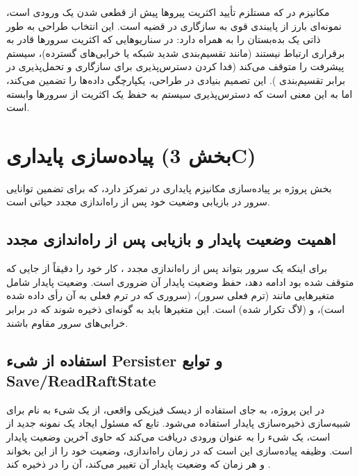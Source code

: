 \documentclass[12pt,a4paper]{article}
\begin{document}
مکانیزم  در  که مستلزم تأیید اکثریت پیروها پیش از قطعی شدن یک ورودی است، نمونه‌ای بارز از پایبندی قوی به سازگاری  در قضیه  است. این انتخاب طراحی به طور ذاتی یک بده‌بستان را به همراه دارد: در سناریوهایی که اکثریت سرورها قادر به برقراری ارتباط نیستند (مانند تقسیم‌بندی شدید شبکه یا خرابی‌های گسترده)، سیستم پیشرفت را متوقف می‌کند (فدا کردن دسترس‌پذیری  برای سازگاری و تحمل‌پذیری در برابر تقسیم‌بندی ). این تصمیم بنیادی در طراحی، یکپارچگی داده‌ها را تضمین می‌کند، اما به این معنی است که دسترس‌پذیری سیستم به حفظ یک اکثریت از سرورها وابسته است.

\section{پیاده‌سازی پایداری (بخش 3C)}

بخش  پروژه بر پیاده‌سازی مکانیزم پایداری در  تمرکز دارد، که برای تضمین توانایی سرور در بازیابی وضعیت خود پس از راه‌اندازی مجدد حیاتی است.

\subsection{اهمیت وضعیت پایدار و بازیابی پس از راه‌اندازی مجدد}

برای اینکه یک سرور  بتواند پس از راه‌اندازی مجدد ، کار خود را دقیقاً از جایی که متوقف شده بود ادامه دهد، حفظ وضعیت پایدار  آن ضروری است. وضعیت پایدار شامل متغیرهایی مانند  (ترم فعلی سرور)،  (سروری که در ترم فعلی به آن رأی داده شده است)، و  (لاگ تکرار شده) است. این متغیرها باید به گونه‌ای ذخیره شوند که در برابر خرابی‌های سرور مقاوم باشند.

\subsection{استفاده از شیء Persister و توابع Save/ReadRaftState}

در این پروژه، به جای استفاده از دیسک فیزیکی واقعی، از یک شیء به نام  برای شبیه‌سازی ذخیره‌سازی پایدار استفاده می‌شود. تابع  که مسئول ایجاد یک نمونه جدید از  است، یک شیء  را به عنوان ورودی دریافت می‌کند که حاوی آخرین وضعیت پایدار  است. وظیفه پیاده‌سازی  این است که در زمان راه‌اندازی، وضعیت خود را از این  بخواند  و هر زمان که وضعیت پایدار آن تغییر می‌کند، آن را در  ذخیره کند .
\end{document}
